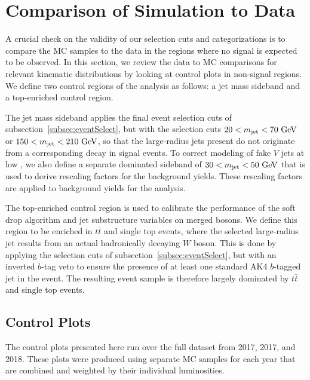 
\section{Comparison of Simulation to Data}
\label{sec:comp}

A crucial check on the validity of our selection cuts and categorizations is to compare the MC samples to the data in the regions where no signal is expected to be observed.
In this section, we review the data to MC comparisons for relevant kinematic distributions by looking at control plots in non-signal regions.
We define two control regions of the analysis as follows: a jet mass sideband and a top-enriched control region.

The jet mass sideband applies the final event selection cuts of subsection~\ref{subsec:eventSelect}, but with the \MJ selection cuts $20<\MJ<70\unit{GeV}$ or $150<\MJ<210\unit{GeV}$, so that the \Vhad large-radius jets present do not originate from a corresponding \VorH decay in signal events.
To correct modeling of fake $V$ jets at low \pt, we also define a separate \Wjets dominated sideband of $30<\MJ<50\unit{GeV}$ that is used to derive rescaling factors for the \Wjets background yields.
These rescaling factors are applied to \Wjets background yields for the analysis.

The top-enriched control region is used to calibrate the performance of the soft drop algorithm and jet substructure variables on merged bosons.
We define this region to be enriched in $t\bar{t}$ and single top events, where the selected large-radius jet results from an actual hadronically decaying $W$ boson.
This is done by applying the selection cuts of subsection~\ref{subsec:eventSelect}, but with an inverted $b$-tag veto to ensure the presence of at least one standard AK4 $b$-tagged jet in the event.
The resulting event sample is therefore largely dominated by $t\bar{t}$ and single top events.

\subsection{Control Plots}

The control plots presented here run over the full dataset from 2017, 2017, and 2018.
These plots were produced using separate MC samples for each year that are combined and weighted by their individual luminosities.

